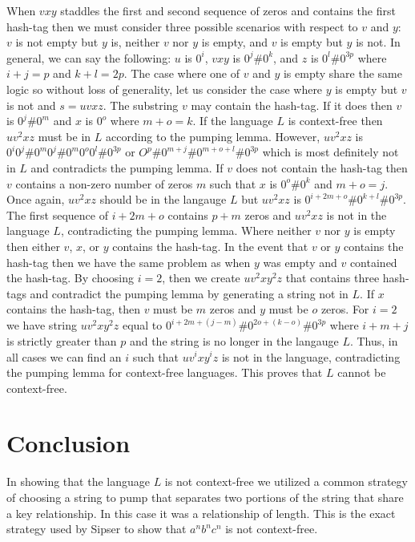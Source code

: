 \documentclass[10pt]{article}
\theoremstyle{definition}
\begin{document}
When $vxy$ staddles the first and second sequence of zeros and contains the first hash-tag then we must consider three possible scenarios with respect to $v$ and $y$: $v$ is not empty but $y$ is, neither $v$ nor $y$ is empty, and $v$ is empty but $y$ is not. In general, we can say the following: $u$ is $0^i$, $vxy$ is $0^j \# 0^k$, and $z$ is $0^{l} \# 0^{3p}$ where $i+j=p$ and $k+l = 2p$. The case where one of $v$ and $y$ is empty share the same logic so without loss of generality, let us consider the case where $y$ is empty but $v$ is not and $s = uvxz$. The substring $v$ may contain the hash-tag. If it does then $v$ is $0^j \# 0^m$ and $x$ is $0^o$ where $m+o=k$. If the language $L$ is context-free then $uv^2xz$ must be in $L$ according to the pumping lemma. However, $uv^2xz$ is $0^i0^j \# 0^m0^j \# 0^m0^o0^l \# 0^{3p}$ or $O^{p} \# 0^{m+j} \# 0^{m+o+l} \# 0^{3p}$ which is most definitely not in $L$ and contradicts the pumping lemma. If $v$ does not contain the hash-tag then $v$ contains a non-zero number of zeros $m$ such that $x$ is $0^o\#0^k$ and $m+o = j$. Once again, $uv^2xz$ should be in the langauge $L$ but $uv^2xz$ is $0^{i+2m+o}\#0^{k+l}\#0^{3p}$. The first sequence of $i+2m+o$ contains $p+m$ zeros and $uv^2xz$ is not in the language $L$, contradicting the pumping lemma. Where neither $v$ nor $y$ is empty then either $v$, $x$, or $y$ contains the hash-tag. In the event that $v$ or $y$ contains the hash-tag then we have the same problem as when $y$ was empty and $v$ contained the hash-tag. By choosing $i=2$, then we create $uv^2xy^2z$ that contains three hash-tags and contradict the pumping lemma by generating a string not in $L$. If $x$ contains the hash-tag, then $v$ must be $m$ zeros and $y$ must be $o$ zeros. For $i=2$ we have string $uv^2xy^2z$ equal to $0^{i+2m+(j-m)} \# 0^{2o+(k-o)} \# 0^{3p}$ where $i+m+j$ is strictly greater than $p$ and the string is no longer in the langauge $L$. Thus, in all cases we can find an $i$ such that $uv^{i}xy^{i}z$ is not in the language, contradicting the pumping lemma for context-free languages.  This proves that $L$ cannot be context-free.

\section{ Conclusion }

In showing that the language $L$ is not context-free we utilized a common strategy of choosing a string to pump that separates two portions of the string that share a key relationship. In this case it was a relationship of length. This is the exact strategy used by Sipser to show that $a^{n}b^{n}c^{n}$ is not context-free.



\end{document}
